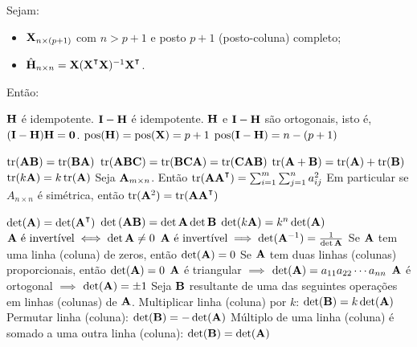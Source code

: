 \begin{theorem}
	Sejam:
	\begin{itemize}
		\item $\mathbf{X}_{n \times (p+1)}$ com $n > p+1$ e posto $p+1$ (posto-coluna) completo;
		\item $\hat{\m{H}}_{n \times n} = \m{X}(\m{X}\T\m{X})\inv\m{X}\T$.
	\end{itemize} Então:
	\begin{outline}[enumerate]
		\1 $\mathbf{H}$ é idempotente.
		\1 $\mathbf{I}-\mathbf{H}$ é idempotente.
		\1 $\mathbf{H}$ e $\mathbf{I}-\mathbf{H}$ são ortogonais, isto é, $(\mathbf{I}-\mathbf{H})\mathbf{H} = \mathbf{0}$.
		\1 \( \operatorname{pos}(\mathbf{H}) = \operatorname{pos}(\mathbf{X}) = p+1\)
		\1 \(\operatorname{pos}(\mathbf{I}-\mathbf{H}) =n-(p+1) \)
	\end{outline}
\end{theorem}

\begin{theorem}
		\leavevmode
	\begin{outline}[enumerate]
		\1 $\operatorname{tr}(\mathbf{A}\mathbf{B}) = \operatorname{tr}(\mathbf{B}\mathbf{A})$
		\1 \( \operatorname{tr}(\mathbf{A} \mathbf{B} \mathbf{C}) = \operatorname{tr} (\mathbf{B} \mathbf{C} \mathbf{A}) = \operatorname{tr} (\mathbf{C} \mathbf{A} \mathbf{B} ) \)
		\1 \( \operatorname{tr}(\mathbf{A} + \mathbf{B}) = \operatorname{tr}(\mathbf{A}) + \operatorname{tr}(\mathbf{B}) \)
		\1 \( \operatorname{tr}(k \mathbf{A}) = k \operatorname{tr} (\mathbf{A}) \)
		\1 Seja $\mathbf{A}_{m \times n}$. Então \( \tr(\m A \m A\T) = \sum_{i=1}^m \sum_{j=1}^n a_{ij}^2 \)
			\2 Em particular se $A_{n \times n}$ é simétrica, então $\tr(\m A^2) = \tr(\m A \m A\T)$
	\end{outline}
\end{theorem}

\begin{theorem}
	\leavevmode
	\begin{outline}[enumerate]
		\1 \( \det(\m{A}) = \det(\m{A}\T) \)
		\1 \( \det{(\mathbf{A}\mathbf{B})} = \det{\mathbf{A}}\det{\mathbf{B}} \)
		\1 \( \det(k\mathbf{A}) = k^n \det(\mathbf{A})\)
		\1 \( \mathbf{A} \text{ é invertível} \iff  \det{\mathbf{A}} \neq 0 \)
		\1 \( \mathbf{A} \text{ é invertível} \implies  \det(\mathbf{A}^{-1}) = \frac{1}{\det\mathbf{A}}\)
		\1 Se $\mathbf{A}$ tem uma linha (coluna) de zeros, então $\det(\mathbf{A})=0$
		\1 Se $\mathbf{A}$ tem duas linhas (colunas) proporcionais, então $\det(\mathbf{A})=0$
		\1 $\mathbf{A}$ é triangular $\implies$ $\det(\mathbf{A})=a_{11} a_{22} \cdots a_{nn}$
		\1 $\mathbf{A}$ é ortogonal $\implies$ $\det(\mathbf{A}) = \pm1$
		\1 Seja $\mathbf{B}$ resultante de uma das seguintes operações em linhas (colunas) de $\mathbf{A}$.
			\2 Multiplicar linha (coluna) por $k$: $\det(\mathbf{B}) = k\det(\mathbf{A})$
			\2 Permutar linha (coluna): $\det(\mathbf{B}) = -\det(\mathbf{A})$
			\2 Múltiplo de uma linha (coluna) é somado a uma outra linha (coluna): $\det(\mathbf{B}) = \det(\mathbf{A})$
	\end{outline}
\end{theorem}

